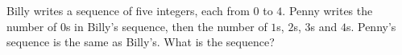 Billy writes a sequence of five integers, each from $0$ to $4$. Penny writes the number of $0$s in Billy's sequence, then the number of $1$s, $2$s, $3$s and $4$s. Penny's sequence is the same as Billy's. What is the sequence?

